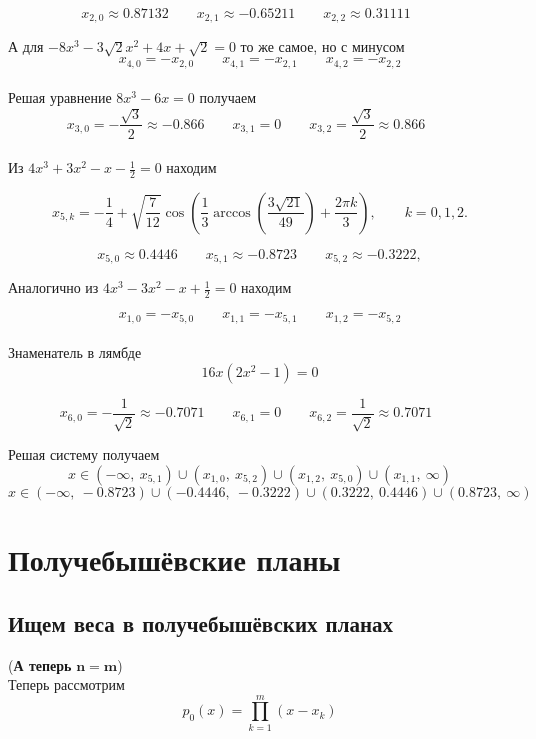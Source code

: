\documentclass[12pt,a4paper]{article}
\begin{document}
	\[
	\boxed
	{
		x_{2,0} \approx 0.87132 \qquad 
		x_{2,1} \approx -0.65211 \qquad 
		x_{2,2} \approx 0.31111 \qquad 
	}
	\]
	
	\noindent А для $-8x^3 - 3\sqrt{2}x^2 + 4x + \sqrt{2} = 0$ то же самое, но с минусом
	\[
	\boxed
	{
		x_{4,0} = - x_{2,0} \qquad 
		x_{4,1} = - x_{2,1} \qquad 
		x_{4,2} = - x_{2,2}
	}
	\]\\
	
	\noindent Решая уравнение $ 8x^3 - 6x = 0$ получаем	
	\[
	\boxed
	{
		x_{3,0} = - \frac{\sqrt3}{2} \approx -0.866 \qquad 
		x_{3,1} = 0 \qquad 
		x_{3,2} = \frac{\sqrt3}{2} \approx 0.866 \qquad 
	}
	\]\\
	
	\noindent Из $4x^3 + 3x^2 -x - \frac{1}{2} = 0$ находим
	
	$$
		x_{5,k}=
		-\frac14+
		\sqrt{\frac7{12}}
		\cos\left(
		\frac13
		\arccos\left(\frac{3\sqrt{21}}{49}\right)
		+\frac{2\pi k}{3}
		\right),
		\qquad
		k=0,1,2.
	$$
	
	$$
	\boxed{
		x_{5,0} \approx 0.4446 \qquad
		x_{5,1} \approx -0.8723 \qquad
		x_{5,2} \approx -0.3222,
	}
	$$
	
	\noindent Аналогично из $4x^3 - 3x^2 -x + \frac{1}{2} = 0$ находим

	$$
	\boxed{
		x_{1,0} = -x_{5,0} \qquad
		x_{1,1} = -x_{5,1} \qquad
		x_{1,2} = -x_{5,2}
	}
	$$\\
	
	\noindent Знаменатель в лямбде
	\[
	16x(2x^2-1) = 0
	\]
	
	\[
	\boxed{
		x_{6,0} = -\frac{1}{\sqrt2} \approx -0.7071 \qquad
		x_{6,1} = 0 \qquad
		x_{6,2} = \frac{1}{\sqrt2} \approx 0.7071  \qquad
	}
	\]
	
	\noindent Решая систему получаем
	\[
	x \in ( -\infty, \ x_{5,1} ) \cup (x_{1,0} , \ x_{5,2}) \cup (x_{1,2} , \ x_{5,0} )  \cup (x_{1,1}, \ \infty)
	\]
	\[
	x \in ( -\infty, \ -0.8723 ) \cup (-0.4446 , \ -0.3222) \cup (0.3222 , \ 0.4446 )  \cup (0.8723, \ \infty)
	\]
	
	\newpage
	\section{Получебышёвские планы}
	\subsection{Ищем веса в получебышёвских планах}
	\noindent (\textbf{А теперь} $\mathbf{n = m}$)\\ 
	Теперь рассмотрим 
	\[
	p_0(x) = \prod_{k=1}^{m} (x-x_k)
	\]
	
\end{document}
